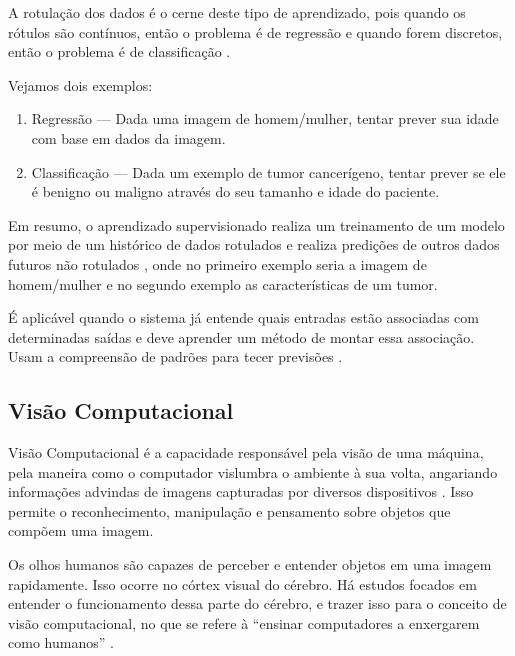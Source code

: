 A rotulação dos dados é o cerne deste tipo de aprendizado, pois quando os rótulos são contínuos, então o problema é de regressão e quando forem discretos, então o problema é de classificação \cite{russell2002artificial}.

Vejamos dois exemplos:
\begin{enumerate}
    \item Regressão — Dada uma imagem de homem/mulher, tentar prever sua idade com base em dados da imagem.
    \item Classificação — Dada um exemplo de tumor cancerígeno, tentar prever se ele é benigno ou maligno através do seu tamanho e idade do paciente.
\end{enumerate}

Em resumo, o aprendizado supervisionado realiza um treinamento de um modelo por meio de um histórico de dados rotulados e realiza predições de outros dados futuros não rotulados \cite{santos2018identificaccao}, onde no primeiro exemplo seria a imagem de homem/mulher e no segundo exemplo as características de um tumor.

É aplicável quando o sistema já entende quais entradas estão associadas com determinadas saídas e deve aprender um método de montar essa associação. Usam a compreensão de padrões para tecer previsões \cite{russell2002artificial}.

\subsection{Visão Computacional}

Visão Computacional é a capacidade responsável pela visão de uma máquina, pela maneira como o computador vislumbra o ambiente à sua volta, angariando informações advindas de imagens capturadas por diversos dispositivos \cite{de2014visao}. Isso permite o reconhecimento, manipulação e pensamento sobre objetos que compõem uma imagem.

Os olhos humanos são capazes de perceber e entender objetos em uma imagem rapidamente. Isso ocorre no córtex visual do cérebro. Há estudos focados em entender o funcionamento dessa parte do cérebro, e trazer isso para o conceito de visão computacional, no que se refere à ``ensinar computadores a enxergarem como humanos'' \cite{david1962eyes}.


